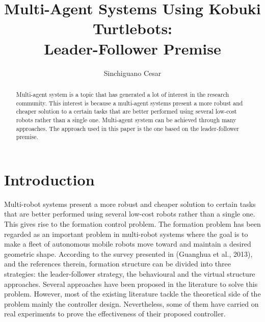 \documentclass[journal]{IEEEtran}
\begin{document}
%
\title{Multi-Agent Systems Using Kobuki Turtlebots:\\Leader-Follower Premise}
\author{Sinchiguano Cesar}






\maketitle

\begin{abstract}

Multi-agent system is a topic that has generated a lot of interest in the research community. This interest is because a multi-agent systems present a more robust and cheaper solution to a certain tasks that are better performed using several low-cost robots rather than a single one. Multi-agent system can be achieved through many approaches. The approach used in this paper is the one based on the leader-follower premise.
\end{abstract}


\section{Introduction}


Multi-robot systems present a more robust and cheaper solution to certain tasks that are better performed using several low-cost robots rather than a single one. This gives rise to the formation control problem. The formation problem has been regarded as an important problem in multi-robot systems where the goal is to make a fleet of autonomous mobile robots move toward and maintain a desired geometric shape. According to the survey presented in (Guanghua et al., 2013)\cite{temp1}, and the references therein, formation structure can be divided into three strategies: the leader-follower strategy, the behavioural and the virtual structure approaches. Several approaches have been proposed in the literature to solve this problem. However, most of the existing literature tackle the theoretical side of the problem mainly the controller design. Nevertheless, some of them have carried on real experiments to prove the effectiveness of their proposed controller. 
\end{document}
